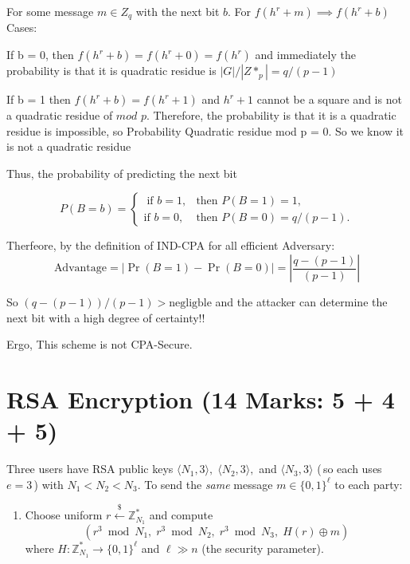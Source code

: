 \documentclass[12pt]{article}
\newcommand{\Z}{\mathbb{Z}}
\newcommand{\xor}{\oplus}
\begin{document}
For some message  $m \in Z_q$ with the next bit $b$. 
For $f(h^r + m) \implies f(h^r + b)$
Cases: 

If b = 0, then $f(h^r + b) = f(h^r + 0) = f(h^r)$ and immediately the probability 
is that it is quadratic residue is $|G| / |Z*_p| = q / (p - 1)$ 

If b = 1 then $f(h^r + b) = f(h^r + 1)$ and $h^r + 1$ cannot be a square and is not a 
quadratic residue of $mod$ $p$. Therefore, the probability 
is that it is a quadratic residue is impossible, so Probability Quadratic residue mod p = 0.
So we know it is not a quadratic residue

Thus, the probability of predicting the next bit 

\[
P(B = b )=
\begin{cases}
\;\text{if } b = 1, & \text{then } P(B = 1) = 1,\\[6pt]
\text{if } b = 0, &  \text{then } P(B = 0) =  q / (p - 1).
\end{cases}
\]

Therfeore, by the definition of IND-CPA for all efficient Adversary:
\[\text{Advantage} = |\Pr(B = 1) - \Pr(B = 0)| = |\frac{q - (p - 1)}{(p - 1)}|\]

So $ (q - (p - 1)) / (p - 1) > \text{negligble}$ and the attacker can determine the next bit 
with a high degree of certainty!!

Ergo, This scheme is not CPA-Secure. 




\section{RSA Encryption \hfill (14 Marks: 5 + 4 + 5)}

Three users have RSA public keys $\langle N_1, 3 \rangle,\; \langle N_2, 3 \rangle,$ and $\langle N_3, 3 \rangle$ (\,so each uses $e = 3$\,) with $N_1 < N_2 < N_3$.  To send the \emph{same} message $m \in \{0,1\}^{\ell}$ to each party:
\begin{enumerate}[label=\arabic*.]
    \item Choose uniform $r \stackrel{\$}{\leftarrow} \Z^{\ast}_{N_1}$ and compute
          \[
              (r^{3} \bmod N_1, \; r^{3} \bmod N_2, \; r^{3} \bmod N_3, \; H(r) \xor m)
          \]
          where $H : \Z^{\ast}_{N_1} \to \{0,1\}^{\ell}$ and $\ell \gg n$ (the security parameter).
\end{enumerate}
\end{document}
